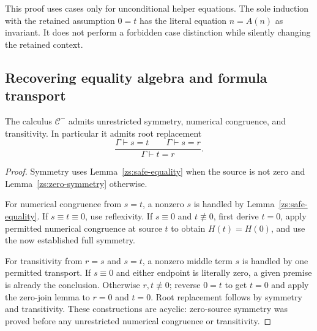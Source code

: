 This proof uses cases only for unconditional helper equations. The
sole induction with the retained assumption $0=t$ has the literal
equation $n=A(n)$ as invariant. It does not perform a forbidden
case distinction while silently changing the retained context.

\subsection{Recovering equality algebra and formula transport}

\begin{lemma}
\label{zs:full-equality}
The calculus $\mathcal C^{-}$ admits unrestricted symmetry,
numerical congruence, and transitivity. In particular it admits
root replacement
\[
 \frac{\Gamma\vdash s=t\qquad\Gamma\vdash s=r}
      {\Gamma\vdash t=r}.
\]
\end{lemma}
\begin{proof}
Symmetry uses Lemma~\ref{zs:safe-equality} when the source is not
zero and Lemma~\ref{zs:zero-symmetry} otherwise.

For numerical congruence from $s=t$, a nonzero $s$ is handled by
Lemma~\ref{zs:safe-equality}. If $s\equiv t\equiv0$, use
reflexivity. If $s\equiv0$ and $t\not\equiv0$, first derive $t=0$,
apply permitted numerical congruence at source $t$ to obtain
$H(t)=H(0)$, and use the now established full symmetry.

For transitivity from $r=s$ and $s=t$, a nonzero middle term $s$
is handled by one permitted transport. If $s\equiv0$ and either
endpoint is literally zero, a given premise is already the
conclusion. Otherwise $r,t\not\equiv0$; reverse $0=t$ to get
$t=0$ and apply the zero-join lemma to $r=0$ and $t=0$.
Root replacement follows by symmetry and transitivity.
These constructions are acyclic: zero-source symmetry was proved
before any unrestricted numerical congruence or transitivity.
\end{proof}

